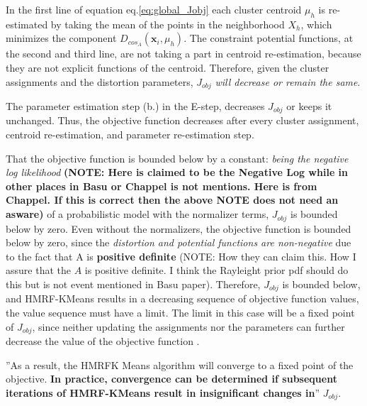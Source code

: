 \documentclass[dvips,dvipdfm,pdftex]{llncs}
\begin{document}
In the first line of equation eq.\ref{eq:global_Jobj} each cluster centroid $μ_{h}$ is re-estimated by taking the mean of the points in the neighborhood $X_{h}$, which minimizes the component $D_{cos_{A}}(\mathbf{x}_{i},\mu_{h})$. The constraint potential functions, at the second and third line, are not taking a part in centroid re-estimation, because they are not explicit functions of the centroid. Therefore, given the cluster assignments and the distortion parameters, $J_{obj}$ \emph{will decrease or remain the same}.

The parameter estimation step (b.) in the E-step, decreases $J_{obj}$ or keeps it unchanged. Thus, the objective function decreases after every cluster assignment, centroid re-estimation, and parameter re-estimation step.

That the objective function is bounded below by a constant: \emph{being the negative log likelihood} \textbf{(NOTE: Here is claimed to be the Negative Log while in other places in Basu or Chappel is not mentions. Here is from Chappel. If this is correct then the above NOTE does not need an asware)} of a probabilistic model with the normalizer terms, $J_{obj}$ is bounded below by zero. Even without the normalizers, the objective function is bounded below by zero, since the \emph{distortion and potential functions are non-negative} due to the fact that A is \textbf{positive definite} (NOTE: How they can claim this. How I assure that the $A$ is positive definite. I think the Rayleight prior pdf should do this but is not event mentioned in Basu paper). Therefore, $J_{obj}$ is bounded below, and HMRF-KMeans results in a decreasing sequence of objective function values, the value sequence must have a limit. The limit in this case will be a fixed point of $J_{obj}$, since neither updating the assignments nor the parameters can further decrease the value of the objective function \cite{chapelle2006semi_hmrf_kmeans}.

''As a result, the HMRFK Means algorithm will converge to a fixed point of the objective. \textbf{In practice, convergence can be determined if subsequent iterations of HMRF-KMeans result in insignificant changes in}'' $J_{obj}$.
\end{document}
